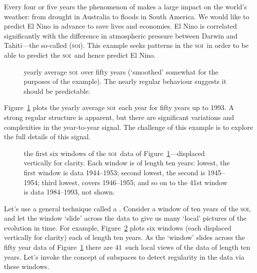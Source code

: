 \begin{example} \label{eg:orthbapp}
\newcommand{\soi}{\textsc{soi}}
Every four or five years the phenomenon of  makes a large impact on the world's weather: from drought in Australia to floods in South America.
We would like to predict El Nino in advance to save lives and economies.
El Nino is correlated significantly with the difference in atmospheric pressure between Darwin and Tahiti---the so-called  (\soi).
This example seeks patterns in the \soi\ in order to be able to predict the \soi\ and hence predict El Nino.

\begin{figure}
\centering

\caption{yearly average \soi\ over fifty years (`smoothed' somewhat for the purposes of the example).  
The nearly regular behaviour suggests it should be predictable.}
\label{fig:soiRoundData}
\end{figure}

Figure~\ref{fig:soiRoundData} plots the yearly average \soi\ each year for fifty years up to 1993.
A strong regular structure is apparent, but there are significant variations and complexities in the year-to-year signal.
The challenge of this example is to explore the full details of this signal.

\begin{figure}
\centering

\caption{the first six windows of the \soi\ data of Figure~\ref{fig:soiRoundData}---displaced vertically for clarity. 
Each window is of length ten years: 
lowest, the first window is data 1944--1953;
second lowest, the second is 1945--1954;
third lowest, covers 1946--1955; 
and so on to the 41st window is data 1984--1993, not shown.}
\label{fig:soiRoundWind}
\end{figure}

Let's use a general technique called a .
Consider a window of ten years of the \soi, and let the window `slide' across the data to give us many `local' pictures of the evolution in time.
For example, Figure~\ref{fig:soiRoundWind} plots six windows (each displaced vertically for clarity) each of length ten years.
As the `window' slides across the fifty year data of Figure~\ref{fig:soiRoundData} there are \(41\)~such local views of the data of length ten years.
Let's invoke the concept of subspaces to detect regularity in the data via these windows.


\end{example}
